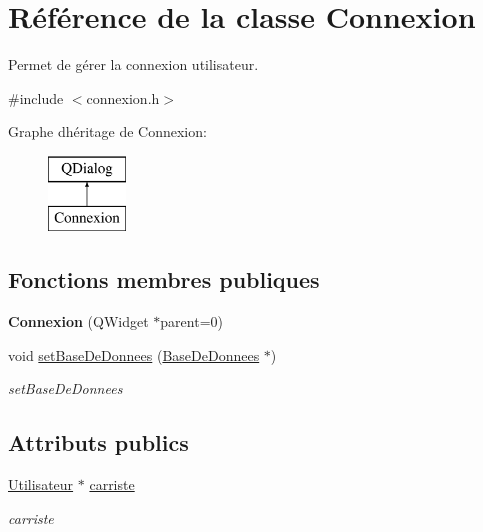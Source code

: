\hypertarget{class_connexion}{}\section{Référence de la classe Connexion}
\label{class_connexion}


Permet de gérer la connexion utilisateur.  




{\ttfamily \#include $<$connexion.\+h$>$}

Graphe d\textquotesingle{}héritage de Connexion\+:\begin{figure}[H]
\begin{center}
\leavevmode
\includegraphics[height=2.000000cm]{class_connexion}
\end{center}
\end{figure}
\subsection*{Fonctions membres publiques}
\begin{DoxyCompactItemize}
\item 
\mbox{\label{class_connexion_a5dc0e175fe7561fa4b1d206ec6f5db96}} 
{\bfseries Connexion} (Q\+Widget $\ast$parent=0)
\item 
\mbox{\label{class_connexion_ac06efdc729b3c51faf35c0e8b7e0fa7d}} 
void \mbox{\hyperlink{class_connexion_ac06efdc729b3c51faf35c0e8b7e0fa7d}{set\+Base\+De\+Donnees}} (\mbox{\hyperlink{class_base_de_donnees}{Base\+De\+Donnees}} $\ast$)
\begin{DoxyCompactList}\small\item\em set\+Base\+De\+Donnees \end{DoxyCompactList}\end{DoxyCompactItemize}
\subsection*{Attributs publics}
\begin{DoxyCompactItemize}
\item 
\mbox{\label{class_connexion_a4ba4496266f3f38b57d7b413f2b7363f}} 
\mbox{\hyperlink{class_utilisateur}{Utilisateur}} $\ast$ \mbox{\hyperlink{class_connexion_a4ba4496266f3f38b57d7b413f2b7363f}{carriste}}
\begin{DoxyCompactList}\small\item\em carriste \end{DoxyCompactList}\end{DoxyCompactItemize}


